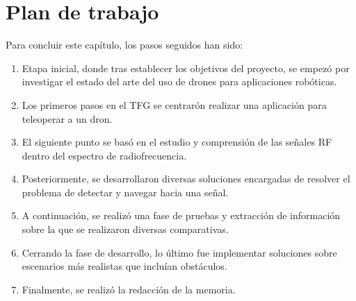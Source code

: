\section{Plan de trabajo}
\label{sec:plantrabajo}

Para concluir este capítulo, los pasos seguidos han sido:

\begin{enumerate}
	\item Etapa inicial, donde tras establecer los objetivos del proyecto, se empezó por investigar el estado del arte del uso de drones para aplicaciones robóticas.
	\item Los primeros pasos en el \ac{TFG} se centrarón realizar una aplicación para teleoperar a un dron.
	\item El siguiente punto se basó en el estudio y comprensión de las señales \ac{RF} dentro del espectro de radiofrecuencia.
	\item Posteriormente, se desarrollaron diversas soluciones encargadas de resolver el problema de detectar y navegar hacia una señal.
	\item A continuación, se realizó una fase de pruebas y extracción de información sobre la que se realizaron diversas comparativas.
	\item Cerrando la fase de desarrollo, lo último fue implementar soluciones sobre escenarios más realistas que incluían obstáculos.
	\item Finalmente, se realizó la redacción de la memoria.
\end{enumerate} 